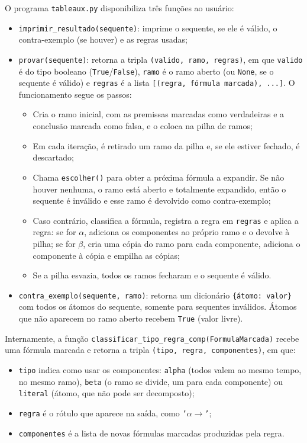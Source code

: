 \documentclass[12pt,a4paper]{article}
\begin{document}
O programa \texttt{tableaux.py} disponibiliza três funções ao usuário:
\begin{itemize}
    \item \texttt{imprimir\_resultado(sequente)}: imprime o sequente, se ele é válido, o contra-exemplo (se houver) e as regras usadas;

    \item \texttt{provar(sequente)}: retorna a tripla \texttt{(valido, ramo, regras)}, em que \texttt{valido} é do tipo booleano (\texttt{True}/\texttt{False}), \texttt{ramo} é o ramo aberto (ou \texttt{None}, se o sequente é válido) e \texttt{regras} é a lista \texttt{[(regra, fórmula marcada), ...]}. O funcionamento segue os passos:
    \begin{itemize}
        \item Cria o ramo inicial, com as premissas marcadas como verdadeiras e a conclusão marcada como falsa, e o coloca na pilha de ramos;
        \item Em cada iteração, é retirado um ramo da pilha e, se ele estiver fechado, é descartado;
        \item Chama \texttt{escolher()} para obter a próxima fórmula a expandir. Se não houver nenhuma, o ramo está aberto e totalmente expandido, então o sequente é inválido e esse ramo é devolvido como contra-exemplo;
        \item Caso contrário, classifica a fórmula, registra a regra em \texttt{regras} e aplica a regra: se for $\alpha$, adiciona os componentes ao próprio ramo e o devolve à pilha; se for $\beta$, cria uma cópia do ramo para cada componente, adiciona o componente à cópia e empilha as cópias;
        \item Se a pilha esvazia, todos os ramos fecharam e o sequente é válido.
    \end{itemize}

    \item \texttt{contra\_exemplo(sequente, ramo)}: retorna um dicionário \texttt{\{átomo: valor\}} com todos os átomos do sequente, somente para sequentes inválidos. Átomos que não aparecem no ramo aberto recebem \texttt{True} (valor livre).
\end{itemize}

\noindent Internamente, a função \texttt{classificar\_tipo\_regra\_comp(FormulaMarcada)} recebe uma fórmula marcada e retorna a tripla \texttt{(tipo, regra, componentes)}, em que:
\begin{itemize}
    \item \texttt{tipo} indica como usar os componentes: \texttt{alpha} (todos valem ao mesmo tempo, no mesmo ramo), \texttt{beta} (o ramo se divide, um para cada componente) ou \texttt{literal} (átomo, que não pode ser decomposto);
    \item \texttt{regra} é o rótulo que aparece na saída, como \texttt{'$\alpha\rightarrow$'};
    \item \texttt{componentes} é a lista de novas fórmulas marcadas produzidas pela regra.
\end{itemize}
\end{document}
